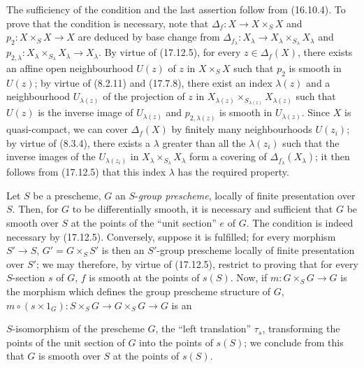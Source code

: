 The sufficiency of the condition and the last assertion follow from (16.10.4). To prove that the condition is necessary, note that $\Delta_f:X\to X\times_SX$ and $p_2:X\times_SX\to X$ are deduced by base change from $\Delta_{f_\lambda}:X_\lambda\to X_\lambda\times_{S_\lambda}X_\lambda$ and $p_{2,\lambda}:X_\lambda\times_{S_\lambda}X_\lambda\to X_\lambda$. By virtue of (17.12.5), for every $z\in\Delta_f(X)$, there exists an affine open neighbourhood $U(z)$ of $z$ in $X\times_SX$ such that $p_2$ is smooth in $U(z)$; by virtue of (8.2.11) and (17.7.8), there exist an index $\lambda(z)$ and a neighbourhood $U_{\lambda(z)}$ of the projection of $z$ in $X_{\lambda(z)}\times_{S_{\lambda(z)}}X_{\lambda(z)}$ such that $U(z)$ is the inverse image of $U_{\lambda(z)}$ and $p_{2,\lambda(z)}$ is smooth in $U_{\lambda(z)}$. Since $X$ is quasi-compact, we can cover $\Delta_f(X)$ by finitely many neighbourhoods $U(z_i)$; by virtue of (8.3.4), there exists a $\lambda$ greater than all the $\lambda(z_i)$ such that the inverse images of the $U_{\lambda(z_i)}$ in $X_\lambda\times_{S_\lambda}X_\lambda$ form a covering of $\Delta_{f_\lambda}(X_\lambda)$; it then follows from (17.12.5) that this index $\lambda$ has the required property.

\begin{examples}[17.12.7]
\label{IV.17.12.7}
Let $S$ be a prescheme, $G$ an $S$-\emph{group prescheme}, locally of finite presentation over $S$. Then, for $G$ to be differentially smooth, it is necessary and sufficient that $G$ be smooth over $S$ at the points of the ``unit section'' $e$ of $G$. The condition is indeed necessary by (17.12.5). Conversely, suppose it is fulfilled; for every morphism $S'\to S$, $G'=G\times_SS'$ is then an $S'$-group prescheme locally of finite presentation over $S'$; we may therefore, by virtue of (17.12.5), restrict to proving that for every $S$-section $s$ of $G$, $f$ is smooth at the points of $s(S)$. Now, if $m:G\times_SG\to G$ is the morphism which defines the group prescheme structure of $G$, $m\circ(s\times1_G):S\times_SG\to G\times_SG\to G$ is an


$S$-isomorphism of the prescheme $G$, the ``left translation'' $\tau_s$, transforming the points of the unit section of $G$ into the points of $s(S)$; we conclude from this that $G$ is smooth over $S$ at the points of $s(S)$.
\end{examples}


